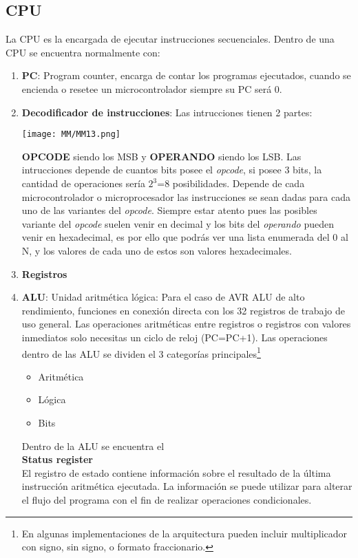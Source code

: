 \documentclass[
	12pt, %
	fleqn, %
	a4paper, %
	oneside, %
]{LegrandOrangeBook}
\begin{document}
\subsection{CPU}
La CPU es la encargada de ejecutar instrucciones secuenciales. Dentro de una CPU se encuentra normalmente con:
\begin{enumerate}
\item \textbf{PC}: Program counter, encarga de contar los programas ejecutados, cuando se encienda o resetee un microcontrolador siempre su PC será 0.
\item \textbf{Decodificador de instrucciones}: Las intrucciones tienen 2 partes:\\
\begin{center}
\texttt{[image: MM/MM13.png]}
\end{center}
\textbf{OPCODE} siendo los MSB y \textbf{OPERANDO} siendo los LSB. Las intrucciones depende de cuantos bits posee el \textit{opcode}, si posee 3 bits, la cantidad de operaciones sería $2^3$=8 posibilidades. Depende de cada microcontrolador o microprocesador las instrucciones se sean dadas para cada uno de las variantes del \textit{opcode}. Siempre estar atento pues las posibles variante del \textit{opcode} suelen venir en decimal y los bits del \textit{operando} pueden venir en hexadecimal, es por ello que podrás ver una lista enumerada del 0 al N, y los valores de cada uno de estos son valores hexadecimales.
\item \textbf{Registros}
\item \textbf{ALU}: Unidad aritmética lógica: Para el caso de AVR ALU de alto rendimiento, funciones en conexión directa con los 32 registros de trabajo de uso general. Las operaciones aritméticas entre registros o registros con valores inmediatos solo necesitas un ciclo de reloj (PC=PC+1). Las operaciones dentro de las ALU se dividen el 3 categorías principales\footnote{En algunas implementaciones de la arquitectura pueden incluir multiplicador con signo, sin signo, o formato fraccionario.}
\begin{itemize}
\item Aritmética
\item Lógica
\item Bits
\end{itemize}
Dentro de la ALU se encuentra el\\ \textbf{Status register}\\
El registro de estado contiene información sobre el resultado de la última instrucción aritmética ejecutada. La información se puede utilizar para alterar el flujo del programa con el fin de realizar operaciones condicionales.

\end{enumerate}
\end{document}
